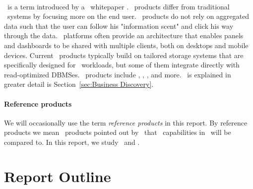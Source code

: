 \paragraph{\bd}
\label{par:Business Discovery}
\bd~is a term introduced by a \qlikview~whitepaper \cite{Qlik2014-vd}. \bd~products differ from traditional \bi~systems by focusing more on the end user. \bd~products do not rely on aggregated data such that the user can follow his "information scent" and click his way through the data. \bd~platforms often provide an architecture that enables panels and dashboards to be shared with multiple clients, both on desktops and mobile devices. Current \bd~products typically build on tailored storage systems that are specifically designed for \bd~workloads, but some of them integrate directly with read-optimized DBMSes. \bd~products include \tableau, \qlikview, \powerpivot, and more. \bd~is explained in greater detail is Section~\ref{sec:Business Discovery}.

\paragraph{Reference products}
\label{par:Reference products}
We will occasionally use the term \textit{reference products} in this report. By reference products we mean \bd~products pointed out by \genus~that \bd~capabilities in \genusSoftware~will be compared to. In this report, we study \qlikview~and \tableau.


\section{Report Outline}
\label{sec:Report Outline}



